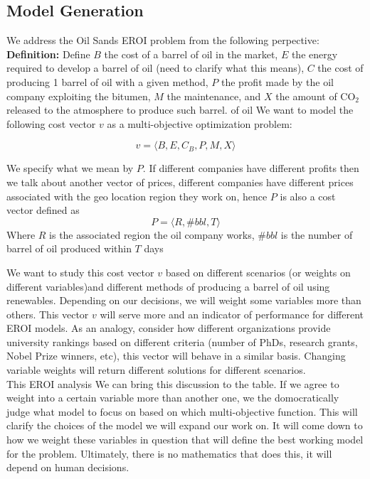 \documentclass[12pt]{article}
\begin{document}
\subsection{Model Generation}

We address the Oil Sands EROI problem from the following perpective: \\

{\bf Definition:} Define $B$ the cost of a barrel of oil in the market, $E$ the energy required to develop a barrel of oil (need to clarify what this means), $C$ the cost of producing 1 barrel of oil with a given method, $P$ the profit made by the oil company exploiting the bitumen,  $M$ the maintenance, and $X$ the amount of CO$_2$ released to the atmosphere to produce such barrel. of oil We want to model the following cost vector $v$ as a multi-objective optimization problem:

\begin{displaymath}
v = \langle B, E, C_B, P,  M, X \rangle
\end{displaymath}

We specify what we mean by $P$. If different companies have different profits then we talk about another vector of prices, different companies have different prices associated with the geo location region they work on, hence $P$ is also a cost vector defined as 
\begin{displaymath}
P = \langle R, \#bbl, T \rangle
\end{displaymath}
Where $R$ is the associated region the oil company works, $\#bbl$ is the number of barrel of oil produced within $T$ days

We want to study this cost vector $v$ based on different scenarios (or weights on different variables)and different methods of producing a barrel of oil using renewables. Depending on our decisions, we will weight some variables more than others. This vector $v$ will serve more and an indicator of performance for different EROI models. As an analogy, consider how different organizations provide university rankings based on different criteria (number of PhDs, research grants, Nobel Prize winners, etc), this vector will behave in a similar basis.  Changing variable weights will return different solutions for different scenarios. \\

This EROI analysis We can bring this discussion to the table. If we agree to weight into a certain variable more than another one, we the domocratically judge what model to focus on based on which multi-objective function. This will clarify the choices of the model we will expand our work on. It will come down to how we weight these variables in question that will define the best working model for the problem. Ultimately, there is no mathematics that does this, it will depend on human decisions. \\
\end{document}
